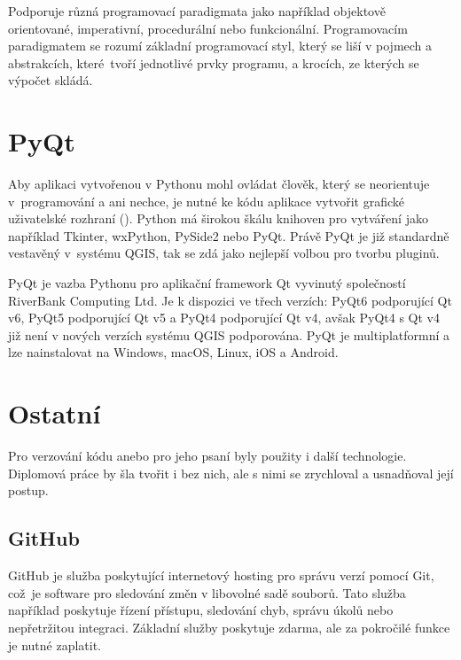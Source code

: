 Podporuje různá programovací paradigmata
jako například objektově orientované, imperativní, procedurální nebo funkcionální.
Programovacím paradigmatem se rozumí základní programovací styl, který se liší v pojmech a abstrakcích,
které~tvo\-ří jednotlivé prvky programu, a krocích, ze kterých se výpočet skládá. \cite{wikipedia-paradigma} 
 
\section{PyQt}
Aby aplikaci vytvořenou v Pythonu mohl ovládat člověk, který se neorientuje v~programování a ani nechce,
je nutné ke kódu aplikace vytvořit grafické uživatelské rozhraní (). Python má širokou škálu knihoven
pro vytváření  jako například Tkinter, wxPython, PySide2 nebo PyQt. Právě PyQt je již standardně 
vestavěný v~systému QGIS, tak se zdá jako nejlepší volbou pro tvorbu pluginů.  

PyQt je vazba Pythonu pro aplikační framework Qt vyvinutý společností RiverBank Computing Ltd.
Je k dispozici ve třech verzích: PyQt6 podporující Qt v6, PyQt5 podporující Qt v5 a PyQt4 podporující Qt v4,
avšak PyQt4 s Qt v4 již není v nových verzích systému QGIS podporována. PyQt je multiplatformní a lze nainstalovat na Windows,
macOS, Linux, iOS a Android. \cite{pyqt}


\section{Ostatní}

Pro verzování kódu anebo pro jeho psaní byly použity i další technologie. Diplomová práce by šla tvořit i bez nich,
ale s nimi se zrychloval a usnadňoval její postup.

\subsection{GitHub}
\label{section-github}

GitHub je služba poskytující internetový hosting pro správu verzí pomocí Git, což~je software pro sledování 
změn v libovolné sadě souborů. Tato služba například poskytuje řízení přístupu, sledování chyb, 
správu úkolů nebo nepřetržitou integraci. Zá\-kladní služby poskytuje zdarma, ale za pokročilé funkce je nutné zaplatit.

